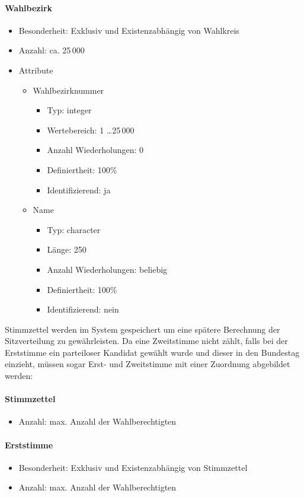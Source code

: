 \documentclass[a4paper]{article}
\begin{document}
\paragraph{Wahlbezirk}
\begin{itemize}
\item Besonderheit: Exklusiv und Existenzabhängig von Wahlkreis
\item Anzahl: ca. 25\,000
\item Attribute
	\begin{itemize}
	\item Wahlbezirknummer
		\begin{itemize}
		\item Typ: integer
		\item Wertebereich: 1 \ldots 25\,000
		\item Anzahl Wiederholungen: 0
		\item Definiertheit: 100\%
		\item Identifizierend: ja
		\end{itemize}
	\item Name
		\begin{itemize}
		\item Typ: character
		\item Länge: 250
		\item Anzahl Wiederholungen: beliebig
		\item Definiertheit: 100\%
		\item Identifizierend: nein
		\end{itemize}
	\end{itemize}
\end{itemize}

Stimmzettel werden im System gespeichert um eine spätere Berechnung der Sitzverteilung zu gewährleisten. Da eine Zweitstimme nicht zählt, falls bei der Erststimme ein parteiloser Kandidat gewählt wurde und dieser in den Bundestag einzieht, müssen sogar Erst- und Zweitstimme mit einer Zuordnung abgebildet werden:

\paragraph{Stimmzettel}
\begin{itemize}
\item Anzahl: max. Anzahl der Wahlberechtigten
\end{itemize}

\paragraph{Erststimme}
\begin{itemize}
\item Besonderheit: Exklusiv und Existenzabhängig von Stimmzettel
\item Anzahl: max. Anzahl der Wahlberechtigten
\end{itemize}
\end{document}
